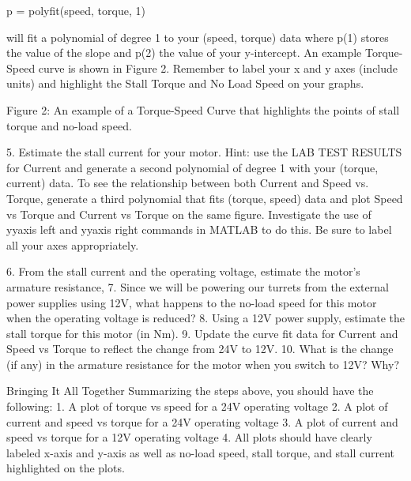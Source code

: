 \documentclass{tufte-handout}
\begin{document}
	p = polyfit(speed, torque, 1)

will fit a polynomial of degree 1 to your (speed, torque) data where p(1) stores the value of the slope and p(2) the value of your y-intercept.  An example Torque-Speed curve is shown in Figure 2.  Remember to label your x and y axes (include units) and highlight the Stall Torque and No Load Speed on your graphs.  

                                       
Figure 2: An example of a Torque-Speed Curve that highlights the points of stall torque and no-load speed.  

    5. Estimate the stall current for your motor.  Hint: use the LAB TEST RESULTS for Current and generate a second polynomial of degree 1 with your (torque, current) data.  To see the relationship between both Current and Speed vs. Torque, generate a third polynomial that fits (torque, speed) data and plot Speed vs Torque and Current vs Torque on the same figure.  Investigate the use of yyaxis left and yyaxis right commands in MATLAB to do this.  Be sure to label all your axes appropriately.

    6. From the stall current and the operating voltage, estimate the motor’s armature resistance, 
    7. Since we will be powering our turrets from the external power supplies using 12V, what happens to the no-load speed for this motor when the operating voltage is reduced?  
    8. Using a 12V power supply, estimate the stall torque for this motor (in Nm).  
    9. Update the curve fit data for Current and Speed vs Torque to reflect the change from 24V to 12V.
    10. What is the change (if any) in the armature resistance for the motor when you switch to 12V?  Why?

Bringing It All Together
Summarizing the steps above, you should have the following:
    1. A plot of torque vs speed for a 24V operating voltage
    2. A plot of current and speed vs torque for a 24V operating voltage
    3. A plot of current and speed vs torque for a 12V operating voltage
    4. All plots should have clearly labeled x-axis and y-axis as well as no-load speed, stall torque, and stall current highlighted on the plots.
\end{document}
